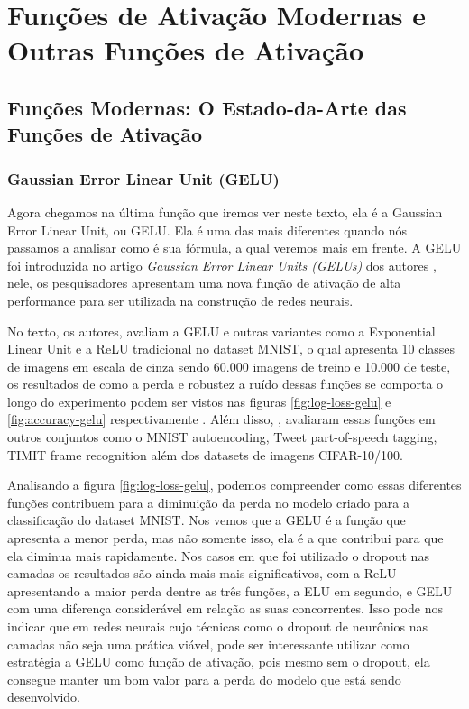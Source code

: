 
\chapter{Funções de Ativação Modernas e Outras Funções de Ativação}
\label{cap:ativacao-modernas-outras}

\section{Funções Modernas: O Estado-da-Arte das Funções de Ativação}

\subsection{Gaussian Error Linear Unit (GELU)}

Agora chegamos na última função que iremos ver neste texto, ela é a Gaussian Error Linear Unit, ou GELU. Ela é uma das mais diferentes quando nós passamos a analisar como é sua fórmula, a qual veremos mais em frente. A GELU foi introduzida no artigo \textit{Gaussian Error Linear Units (GELUs)} dos autores \textcite{GELUArticle}, nele, os pesquisadores apresentam uma nova função de ativação de alta performance para ser utilizada na construção de redes neurais.

No texto, os autores, avaliam a GELU e outras variantes como a Exponential Linear Unit e a ReLU tradicional no dataset MNIST, o qual apresenta 10 classes de imagens em escala de cinza sendo 60.000 imagens de treino e 10.000 de teste, os resultados de como a perda e robustez a ruído dessas funções se comporta o longo do experimento podem ser vistos nas figuras \ref{fig:log-loss-gelu} e \ref{fig:accuracy-gelu} respectivamente \parencite{GELUArticle}. Além disso, \textcite{GELUArticle}, avaliaram essas funções em outros conjuntos como o MNIST autoencoding, Tweet part-of-speech tagging, TIMIT frame recognition além dos datasets de imagens CIFAR-10/100. 

Analisando a figura \ref{fig:log-loss-gelu}, podemos compreender como essas diferentes funções contribuem para a diminuição da perda no modelo criado para a classificação do dataset MNIST. Nos vemos que a GELU é a função que apresenta a menor perda, mas não somente isso, ela é a que contribui para que ela diminua mais rapidamente. Nos casos em que foi utilizado o dropout nas camadas os resultados são ainda mais mais significativos, com a ReLU apresentando a maior perda dentre as três funções, a ELU em segundo, e GELU com uma diferença considerável em relação as suas concorrentes. Isso pode nos indicar que em redes neurais cujo técnicas como o dropout de neurônios nas camadas não seja uma prática viável, pode ser interessante utilizar como estratégia a GELU como função de ativação, pois mesmo sem o dropout, ela consegue manter um bom valor para a perda do modelo que está sendo desenvolvido.

